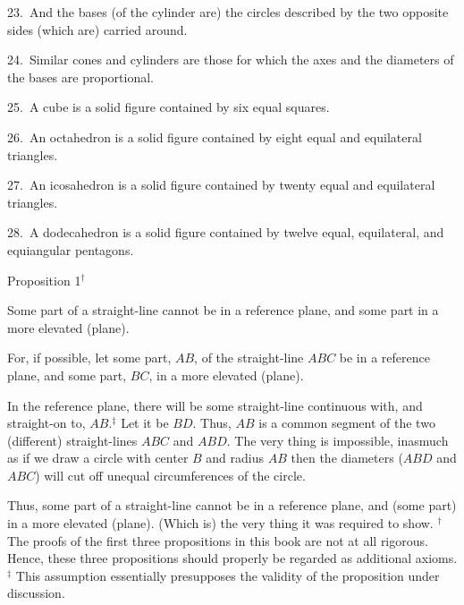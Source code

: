 23.~And the bases (of the cylinder are) the circles described by the
 two opposite sides (which are) carried around.
 
24.~Similar cones and cylinders are those for which the axes and the diameters
 of the bases are proportional.
 
25.~A cube is a solid figure contained by six equal squares.

26.~An octahedron is a solid figure contained by eight equal and
 equilateral triangles.
 
 27.~An icosahedron is a solid figure contained by twenty equal and
 equilateral triangles.
 
28.~A dodecahedron is a solid figure contained by twelve equal,
 equilateral, and equiangular pentagons.
 

\begin{center}
{\large Proposition 1}$^\dag$
\end{center}

Some part of a straight-line cannot be in a reference
plane, and some part in a more elevated (plane).

For, if possible, let some part, $AB$, of the straight-line $ABC$ be
in a reference plane, and some part, $BC$, in a more elevated (plane).

In the reference plane, there will be some straight-line continuous with, and straight-on to, $AB$.$^\ddag$ Let it be $BD$. Thus, $AB$ is a common
segment of the two (different) straight-lines $ABC$ and $ABD$. The
very thing is impossible, inasmuch as if we draw a circle with center $B$
and radius $AB$ then the diameters ($ABD$ and $ABC$) will cut off unequal circumferences
of the circle.

\epsfysize=2.5in
\centerline{}

Thus, some part of a straight-line cannot be in a reference
plane, and (some part) in a more elevated (plane). (Which is) the very thing it
was required to show.
{\footnotesize\noindent$^\dag$ The proofs of the first three propositions in this book are not at all rigorous. Hence,  these three propositions should properly be regarded as additional axioms.}\\
{\footnotesize\noindent$^\ddag$ This assumption essentially presupposes the validity of the proposition under discussion.} 


